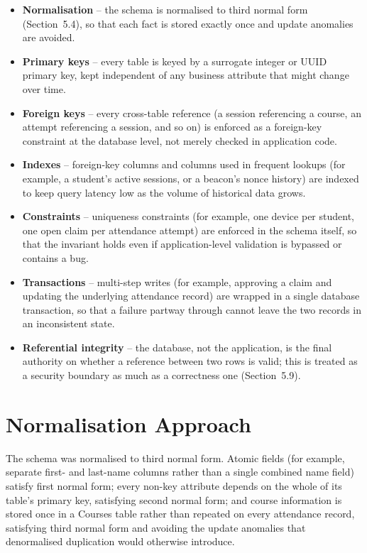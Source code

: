 \documentclass[12pt, a4paper, oneside]{report}
\begin{document}
\begin{itemize}
    \item \textbf{Normalisation} -- the schema is normalised to third normal form (Section~5.4), so that each fact is stored exactly once and update anomalies are avoided.
    \item \textbf{Primary keys} -- every table is keyed by a surrogate integer or UUID primary key, kept independent of any business attribute that might change over time.
    \item \textbf{Foreign keys} -- every cross-table reference (a session referencing a course, an attempt referencing a session, and so on) is enforced as a foreign-key constraint at the database level, not merely checked in application code.
    \item \textbf{Indexes} -- foreign-key columns and columns used in frequent lookups (for example, a student's active sessions, or a beacon's nonce history) are indexed to keep query latency low as the volume of historical data grows.
    \item \textbf{Constraints} -- uniqueness constraints (for example, one device per student, one open claim per attendance attempt) are enforced in the schema itself, so that the invariant holds even if application-level validation is bypassed or contains a bug.
    \item \textbf{Transactions} -- multi-step writes (for example, approving a claim and updating the underlying attendance record) are wrapped in a single database transaction, so that a failure partway through cannot leave the two records in an inconsistent state.
    \item \textbf{Referential integrity} -- the database, not the application, is the final authority on whether a reference between two rows is valid; this is treated as a security boundary as much as a correctness one (Section~5.9).
\end{itemize}

\section{Normalisation Approach}

The schema was normalised to third normal form. Atomic fields (for example, separate first- and last-name columns rather than a single combined name field) satisfy first normal form; every non-key attribute depends on the whole of its table's primary key, satisfying second normal form; and course information is stored once in a Courses table rather than repeated on every attendance record, satisfying third normal form and avoiding the update anomalies that denormalised duplication would otherwise introduce.
\end{document}
